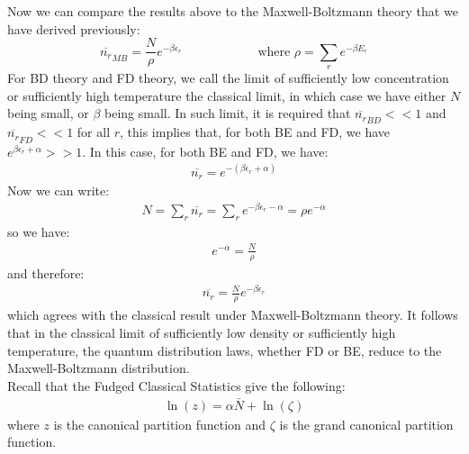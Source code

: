 \documentclass[11pt,oneside]{book}
\theoremstyle{break}
\theoremstyle{break}
\begin{document}
Now we can compare the results above to the Maxwell-Boltzmann theory that we have derived previously:
$$\overline{n_r}_{MB} =  \frac{N}{\rho}e^{-\beta \epsilon_r}\qquad\qquad\qquad \text{where } \rho = \sum_r e^{-\beta E_r}$$
For BD theory and FD theory, we call the limit of sufficiently low concentration or sufficiently high temperature the classical limit, in which case we have either $N$ being small, or $\beta$ being small. In such limit, it is required that $\overline{n_r}_{BD} << 1$ and $\overline{n_r}_{FD} << 1$ for all $r$, this implies that, for both BE and FD, we have$e^{\beta \epsilon_r + \alpha} >>1 $. In this case, for both BE and FD, we have:
\begin{align*}
\overline{n_r} = e^{-(\beta \epsilon_r + \alpha)}
\end{align*}
Now we can write:
\begin{align*}
N = \sum_r \overline{n_r} = \sum_r e^{-\beta \epsilon_r - \alpha} = \rho e^{-\alpha}
\end{align*}
so we have:
\begin{align*}
e^{-\alpha} = \frac{N}{\rho}
\end{align*}
and therefore:
\begin{align*}
\overline{n_r} = \frac{N}{\rho} e^{-\beta \epsilon_r}
\end{align*}
which agrees with the classical result under Maxwell-Boltzmann theory. It follows that in the classical limit of sufficiently low density or sufficiently high temperature, the quantum distribution laws, whether FD or BE, reduce to the Maxwell-Boltzmann distribution.\\

Recall that the Fudged Classical Statistics give the following:
\begin{align*}
\ln(z) = \alpha \bar{N} + \ln(\zeta)
\end{align*}
where $z$ is the canonical partition function and $\zeta$ is the grand canonical partition function.\\
\end{document}
